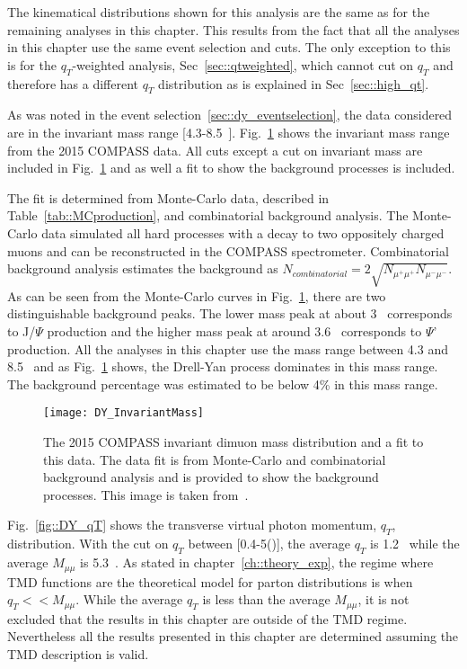 The kinematical distributions shown for this analysis are the same as for the
remaining analyses in this chapter.  This results from the fact that all the
analyses in this chapter use the same event selection and cuts.  The only
exception to this is for the $q_T$-weighted analysis, Sec~\ref{sec::qtweighted},
which cannot cut on $q_T$ and therefore has a different $q_T$ distribution as is
explained in Sec~\ref{sec::high_qt}.

As was noted in the event selection~\ref{sec::dy_eventselection}, the data
considered are in the invariant mass range [4.3-8.5~{\gvcw}].
Fig.~\ref{fig::DY_InvariantMass} shows the invariant mass range from the 2015
COMPASS data.  All cuts except a cut on invariant mass are included in
Fig.~\ref{fig::DY_InvariantMass} and as well a fit to show the background
processes is included.

The fit is determined from Monte-Carlo data, described in
Table~\ref{tab::MCproduction}, and combinatorial background analysis.  The
Monte-Carlo data simulated all hard processes with a decay to two oppositely
charged muons and can be reconstructed in the COMPASS spectrometer.
Combinatorial background analysis estimates the background as $N_{combinatorial}
= 2\sqrt{N_{\mu^+\mu^+}N_{\mu^-\mu^-}}$.  As can be seen from the Monte-Carlo
curves in Fig.~\ref{fig::DY_InvariantMass}, there are two distinguishable
background peaks.  The lower mass peak at about 3~{\gvcw} corresponds to
J/$\Psi$ production and the higher mass peak at around 3.6~{\gvcw} corresponds
to $\Psi$' production.  All the analyses in this chapter use the mass range
between 4.3 and 8.5~{\gvcw} and as Fig.~\ref{fig::DY_InvariantMass} shows, the
Drell-Yan process dominates in this mass range.  The background percentage was
estimated to be below 4\% in this mass range.

\begin{figure}[h!t]
  \centering \texttt{[image: DY\_InvariantMass]}
  \caption{The 2015 COMPASS invariant dimuon mass distribution and a fit to this
    data.  The data fit is from Monte-Carlo and combinatorial background
    analysis and is provided to show the background processes.  This image is
    taken from~\cite{compassDYpaper}.}
  \label{fig::DY_InvariantMass}
\end{figure}

Fig.~\ref{fig::DY_qT} shows the transverse virtual photon momentum, $q_T$,
distribution.  With the cut on $q_T$ between [0.4-5({\gvc})], the average $q_T$
is 1.2~{\gvc} while the average $M_{\mu\mu}$ is 5.3~{\gvcw}.  As stated in
chapter~\ref{ch::theory_exp}, the regime where TMD functions are the theoretical
model for parton distributions is when $q_T << M_{\mu\mu}$.  While the average
$q_T$ is less than the average $M_{\mu\mu}$, it is not excluded that the results
in this chapter are outside of the TMD regime.  Nevertheless all the results
presented in this chapter are determined assuming the TMD description is valid.


